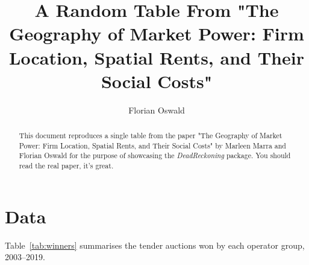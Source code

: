 \documentclass{article}
\title{A Random Table From "The Geography of Market Power: Firm Location,
Spatial Rents, and Their Social Costs"}
\author{Florian Oswald}
\begin{document}
\maketitle

\begin{abstract}
This document reproduces a single table from the paper "The Geography of Market Power: Firm Location,
Spatial Rents, and Their Social Costs" by Marleen Marra and Florian Oswald for the purpose of showcasing the \emph{DeadReckoning} package. You should read the real paper, it's great.
\end{abstract}

\section{Data}

Table~\ref{tab:winners} summarises the tender auctions won by each operator
group, 2003--2019.

\begin{table}[h]
\centering

\caption{Winning groups by tender auction}
\label{tab:winners}
\end{table}
\end{document}
